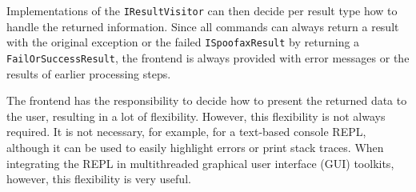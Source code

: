 Implementations of the \texttt{IResultVisitor} can then decide per result type
how to handle the returned information. Since all commands can always return a
result with the original exception or the failed \texttt{ISpoofaxResult} by
returning a \texttt{FailOrSuccessResult}, the frontend is always provided with
error messages or the results of earlier processing steps.

The frontend has the responsibility to decide how to present the returned data
to the user, resulting in a lot of flexibility. However, this flexibility is not
always required. It is not necessary, for example, for a text-based console
REPL, although it can be used to easily highlight errors or print stack
traces. When integrating the REPL in multithreaded graphical user interface
(GUI) toolkits, however, this flexibility is very useful.

